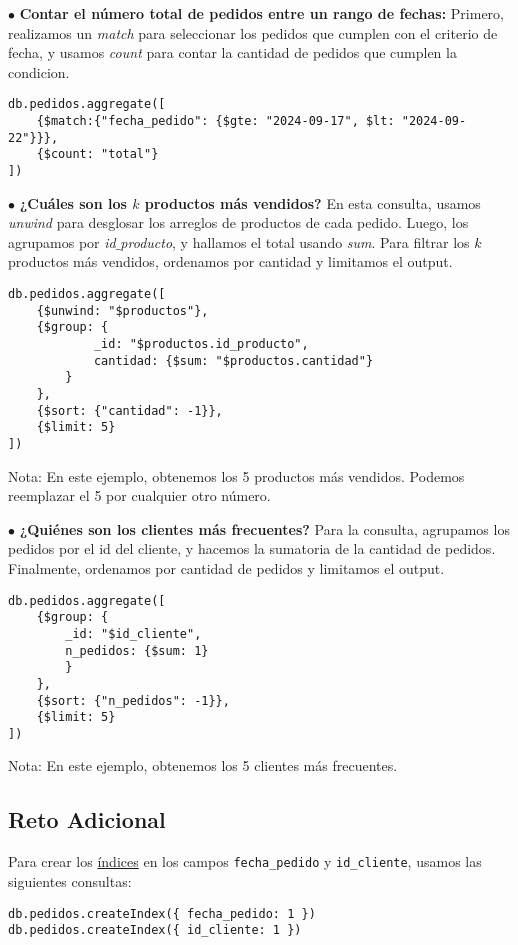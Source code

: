 $\bullet$ \textbf{Contar el número total de pedidos entre un rango de fechas:} Primero, realizamos un \textit{match} para seleccionar
los pedidos que cumplen con el criterio de fecha, y usamos \textit{count} para contar la cantidad de pedidos que cumplen la condicion.
\begin{verbatim}
db.pedidos.aggregate([
    {$match:{"fecha_pedido": {$gte: "2024-09-17", $lt: "2024-09-22"}}},
    {$count: "total"}
])
\end{verbatim}

$\bullet$ \textbf{¿Cuáles son los $k$ productos más vendidos?} En esta consulta, usamos \textit{unwind} para desglosar los arreglos
de productos de cada pedido. Luego, los agrupamos por \textit{id$\_$producto}, y hallamos el total usando \textit{sum}. Para filtrar los
$k$ productos más vendidos, ordenamos por cantidad y limitamos el output.
\begin{verbatim}
db.pedidos.aggregate([
    {$unwind: "$productos"},
    {$group: {
            _id: "$productos.id_producto",
            cantidad: {$sum: "$productos.cantidad"}
        }
    },
    {$sort: {"cantidad": -1}},
    {$limit: 5}
])
\end{verbatim}

Nota: En este ejemplo, obtenemos los 5 productos más vendidos. Podemos
reemplazar el 5 por cualquier otro número.

$\bullet$ \textbf{¿Quiénes son los clientes más frecuentes?} Para la consulta, agrupamos los pedidos por el id del cliente,
y hacemos la sumatoria de la cantidad de pedidos. Finalmente, ordenamos por cantidad de pedidos y limitamos el output.
\begin{verbatim}
db.pedidos.aggregate([
    {$group: {
        _id: "$id_cliente",
        n_pedidos: {$sum: 1}
        }
    },
    {$sort: {"n_pedidos": -1}},
    {$limit: 5}
])
\end{verbatim}

Nota: En este ejemplo, obtenemos los 5 clientes más frecuentes.

\subsection{Reto Adicional}

Para crear los \hyperref[fig:creacionindices]{índices} en los campos \texttt{fecha\_pedido} y \texttt{id\_cliente}, usamos
las siguientes consultas:

\begin{verbatim}
db.pedidos.createIndex({ fecha_pedido: 1 })
db.pedidos.createIndex({ id_cliente: 1 })
\end{verbatim}

